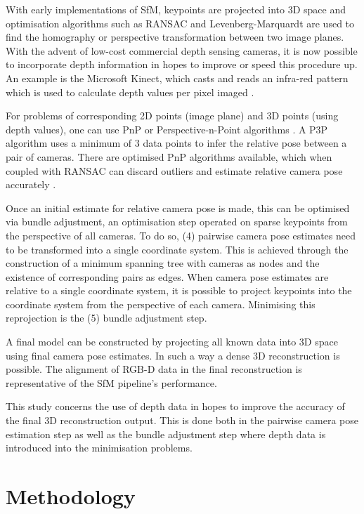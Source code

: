 \documentclass[10pt,twocolumn,letterpaper]{article}
\begin{document}
With early implementations of SfM, keypoints are projected into 3D space and
optimisation algorithms such as RANSAC and Levenberg-Marquardt are used to find
the homography or perspective transformation between two image planes. With the
advent of low-cost commercial depth sensing cameras, it is now possible to
incorporate depth information in hopes to improve or speed this procedure up. An
example is the Microsoft Kinect, which casts and reads an infra-red pattern
which is used to calculate depth values per pixel imaged \cite{zhang2012microsoft}.

For problems of corresponding 2D points (image plane) and 3D points (using depth
values), one can use PnP or Perspective-n-Point algorithms \cite{d2013p3p}. A P3P
algorithm uses a minimum of 3 data points to infer the relative pose between a
pair of cameras. There are optimised PnP algorithms available, which when
coupled with RANSAC can discard outliers and estimate relative camera pose
accurately \cite{lepetit2009epnp}.

Once an initial estimate for relative camera pose is made, this can be optimised
via bundle adjustment, an optimisation step operated on sparse keypoints from
the perspective of all cameras. To do so, (4) pairwise camera pose estimates
need to be transformed into a single coordinate system. This is achieved through
the construction of a minimum spanning tree with cameras as nodes and the
existence of corresponding pairs as edges. When camera pose estimates are
relative to a single coordinate system, it is possible to project keypoints into
the coordinate system from the perspective of each camera. Minimising this
reprojection is the (5) bundle adjustment step.

A final model can be constructed by projecting all known data into 3D space
using final camera pose estimates. In such a way a dense 3D reconstruction is
possible. The alignment of RGB-D data in the final reconstruction is
representative of the SfM pipeline's performance.

This study concerns the use of depth data in hopes to improve the accuracy of
the final 3D reconstruction output. This is done both in the pairwise camera
pose estimation step as well as the bundle adjustment step where depth data
is introduced into the minimisation problems.



\section{Methodology}
\end{document}
